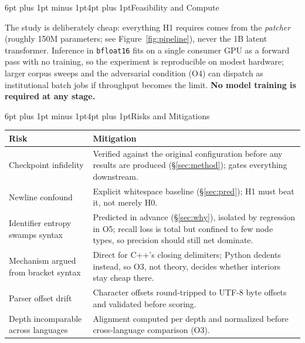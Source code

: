 \documentclass[9pt]{extarticle}
\makeatletter
\renewcommand\section{\@startsection{section}{1}{0pt}%
  {6pt plus 1pt minus 1pt}{4pt plus 1pt}{\normalfont\large\bfseries}}
\newcommand{\code}[1]{\texttt{\small #1}}
\makeatother
\begin{document}
\section{Feasibility and Compute}

The study is deliberately cheap: everything H1 requires comes from the
\emph{patcher} (roughly 150M parameters; see Figure~\ref{fig:pipeline}), never
the 1B latent transformer. Inference in \code{bfloat16} fits
on a single consumer GPU as a forward pass with no training, so the experiment
is reproducible on modest hardware; larger corpus sweeps and the adversarial
condition (O4) can dispatch as institutional batch jobs if throughput becomes
the limit. \textbf{No model training is required at any stage.}

\section{Risks and Mitigations}

\noindent
\begin{center}
\small
\begin{tabular}{@{}p{2.4cm}p{5.5cm}@{}}
\toprule
\textbf{Risk} & \textbf{Mitigation} \\
\midrule
Checkpoint infidelity &
Verified against the original configuration before any results are produced
(\S\ref{sec:method}); gates everything downstream. \\[1pt]
Newline confound &
Explicit whitespace baseline (\S\ref{sec:pred}); H1 must beat it, not merely H0. \\[1pt]
Identifier entropy swamps syntax &
Predicted in advance (\S\ref{sec:why}), isolated by regression in O5; recall
loss is total but confined to few node types, so precision should still net
dominate. \\[1pt]
Mechanism argued from bracket syntax &
Direct for C++'s closing delimiters; Python dedents instead, so O3, not
theory, decides whether interiors stay cheap there. \\[1pt]
Parser offset drift &
Character offsets round-tripped to UTF-8 byte offsets and validated before scoring. \\[1pt]
Depth incomparable across languages &
Alignment computed per depth and normalized before cross-language comparison (O3). \\
\bottomrule
\end{tabular}
\label{tab:risks}
\end{center}
\end{document}
